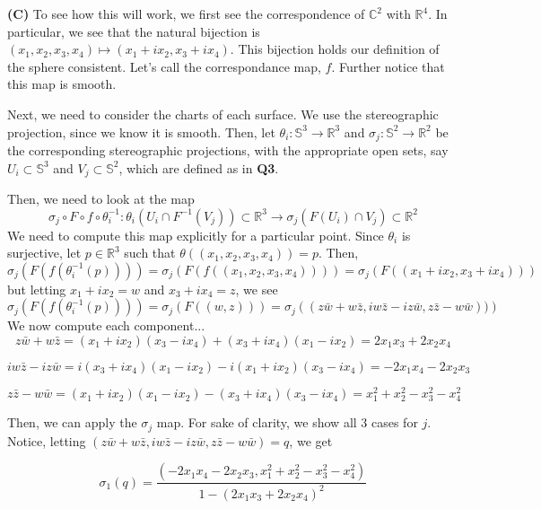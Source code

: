 \documentclass[10pt]{article}
\newcommand{\R}{\mathbb{R}}
\newcommand{\C}{\mathbb{C}}
\newcommand{\Sp}{\mathbb{S}}
\begin{document}
\textbf{(C)} To see how this will work, we first see the correspondence of $\C^{2}$ with $\R^{4}$. In particular, we see that the natural bijection is $(x_{1},x_{2},x_{3},x_{4}) \mapsto (x_{1} + ix_{2},x_{3} + ix_{4})$. This bijection holds our definition of the sphere consistent. Let's call the correspondance map, $f$. Further notice that this map is smooth.

Next, we need to consider the charts of each surface. We use the stereographic projection, since we know it is smooth. Then, let $\theta_{i}: \Sp^{3}\to \R^{3}$ and $\sigma_{j}: \Sp^{2} \to \R^{2}$ be the corresponding stereographic projections, with the appropriate open sets, say $U_{i}\subset \Sp^{3}$ and $V_{j}\subset \Sp^{2}$, which are defined as in \textbf{Q3}.

Then, we need to look at the map
$$\sigma_{j} \circ F \circ f \circ \theta_{i}^{-1}: \theta_{i}(U_{i}\cap F^{-1}(V_{j}))\subset \R^{3} \to \sigma_{j}(F(U_{i})\cap V_{j})\subset \R^{2}$$ 
We need to compute this map explicitly for a particular point. Since $\theta_{i}$ is surjective, let $p\in \R^{3}$ such that $\theta((x_{1},x_{2},x_{3},x_{4})) = p$. Then,
$$\sigma_{j} \left( F \left( f \left (\theta_{i}^{-1} (p)\right)\right) \right) = \sigma_{j} \left( F \left( f \left( (x_{1},x_{2},x_{3},x_{4})\right)\right)\right) = \sigma_{j} \left( F \left( (x_{1} +ix_{2}, x_{3} + ix_{4})\right)\right)$$
but letting $x_{1} + ix_{2} = w$ and $x_{3} + ix_{4} = z$, we see
$$\sigma_{j} \left( F \left( f \left (\theta_{i}^{-1} (p)\right)\right) \right) = \sigma_{j} \left( F \left( (w,z)\right)\right) = \sigma_{j} \left((z\bar{w} + w\bar{z},iw\bar{z} - iz\bar{w},z\bar{z} - w\bar{w}))\right)$$
We now compute each component...
$$z\bar{w} + w\bar{z} = (x_{1} + ix_{2})(x_{3} - ix_{4}) + (x_{3} + ix_{4})(x_{1} - ix_{2}) = 2x_{1}x_{3} + 2x_{2}x_{4}$$

$$iw\bar{z} - iz\bar{w} = i(x_{3} + ix_{4})(x_{1}-ix_{2}) - i(x_{1} + ix_{2})(x_{3} - ix_{4}) = -2x_{1}x_{4} -2x_{2}x_{3}$$

$$z\bar{z} - w\bar{w} = (x_{1} + ix_{2})(x_{1} - ix_{2}) - (x_{3} + ix_{4})(x_{3} - ix_{4}) = x_{1}^{2} + x_{2}^{2} - x_{3}^{2} - x_{4}^{2}$$

Then, we can apply the $\sigma_{j}$ map. For sake of clarity, we show all 3 cases for $j$. Notice, letting $(z\bar{w} + w\bar{z},iw\bar{z} - iz\bar{w},z\bar{z} - w\bar{w}) = q$, we get

$$\sigma_{1}(q) = \frac{(-2x_{1}x_{4} - 2x_{2}x_{3},x_{1}^{2} + x_{2}^{2} - x_{3}^{2} - x_{4}^{2})}{1 - (2x_{1}x_{3} + 2x_{2}x_{4})^{2}}$$
\end{document}
